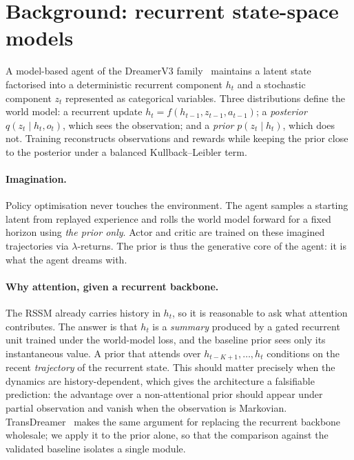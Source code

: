 \documentclass[11pt,onecolumn]{article}
\begin{document}
\section{Background: recurrent state-space models}
A model-based agent of the DreamerV3 family~\cite{hafner2023} maintains
a latent state factorised into a deterministic recurrent component
$h_t$ and a stochastic component $z_t$ represented as categorical
variables. Three distributions define the world model: a recurrent
update $h_t = f(h_{t-1}, z_{t-1}, a_{t-1})$; a \emph{posterior}
$q(z_t \mid h_t, o_t)$, which sees the observation; and a \emph{prior}
$p(z_t \mid h_t)$, which does not. Training reconstructs observations
and rewards while keeping the prior close to the posterior under a
balanced Kullback--Leibler term.

\paragraph{Imagination.}
Policy optimisation never touches the environment. The agent samples a
starting latent from replayed experience and rolls the world model
forward for a fixed horizon using \emph{the prior only}. Actor and
critic are trained on these imagined trajectories via
$\lambda$-returns. The prior is thus the generative core of the agent:
it is what the agent dreams with.

\paragraph{Why attention, given a recurrent backbone.}\label{sec:background-attention}
The RSSM already carries history in $h_t$, so it is reasonable to ask
what attention contributes. The answer is that $h_t$ is a \emph{summary}
produced by a gated recurrent unit trained under the world-model loss,
and the baseline prior sees only its instantaneous value. A prior that
attends over $h_{t-K+1}, \dots, h_t$ conditions on the recent
\emph{trajectory} of the recurrent state. This should matter precisely
when the dynamics are history-dependent, which gives the architecture a
falsifiable prediction: the advantage over a non-attentional prior
should appear under partial observation and vanish when the observation
is Markovian. TransDreamer~\cite{transdreamer} makes the same argument
for replacing the recurrent backbone wholesale; we apply it to the prior
alone, so that the comparison against the validated baseline isolates a
single module.
\end{document}
